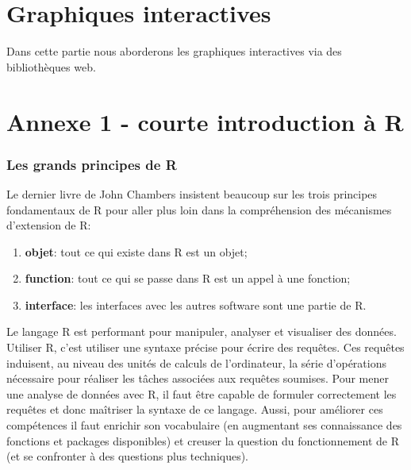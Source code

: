 \documentclass[]{article}
\providecommand{\tightlist}{%
  \setlength{\itemsep}{0pt}\setlength{\parskip}{0pt}}
\begin{document}
\hypertarget{graphiques-interactives}{%
\section{Graphiques interactives}\label{graphiques-interactives}}

Dans cette partie nous aborderons les graphiques interactives via des bibliothèques web.

\hypertarget{annexe-1---courte-introduction-uxe0-r}{%
\section*{Annexe 1 - courte introduction à R}\label{annexe-1---courte-introduction-uxe0-r}}

\hypertarget{les-grands-principes-de-r}{%
\subsubsection{Les grands principes de R}\label{les-grands-principes-de-r}}

Le dernier livre de John Chambers \citep{chambers_extending_2016} insistent beaucoup
sur les trois principes fondamentaux de R pour aller plus loin dans
la compréhension des mécanismes d'extension de R:

\begin{enumerate}
\def\labelenumi{\arabic{enumi}.}
\tightlist
\item
  \textbf{objet}: tout ce qui existe dans R est un objet;
\item
  \textbf{function}: tout ce qui se passe dans R est un appel à une fonction;
\item
  \textbf{interface}: les interfaces avec les autres software sont une partie de R.
\end{enumerate}

Le langage R est performant pour manipuler, analyser et visualiser des données.
Utiliser R, c'est utiliser une syntaxe précise pour écrire des requêtes. Ces
requêtes induisent, au niveau des unités de calculs de l'ordinateur, la série
d'opérations nécessaire pour réaliser les tâches associées aux requêtes soumises.
Pour mener une analyse de données avec R, il faut être capable de formuler
correctement les requêtes et donc maîtriser la syntaxe de ce langage. Aussi,
pour améliorer ces compétences il faut enrichir son vocabulaire (en augmentant
ses connaissance des fonctions et packages disponibles) et creuser la question
du fonctionnement de R (et se confronter à des questions plus techniques).
\end{document}
